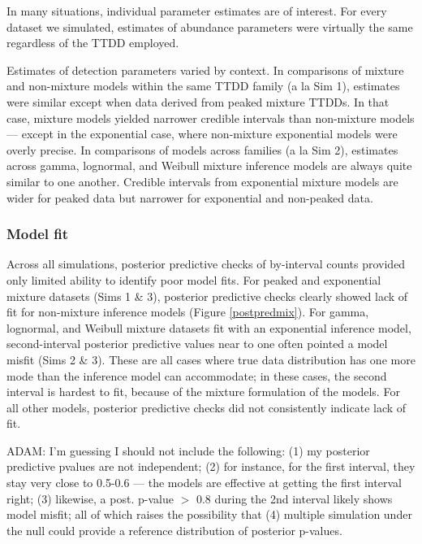 \documentclass[useAMS,usenatbib,referee,12pt]{article}
\newcommand{\adam}[1]{{\color{blue} ADAM: #1}}
\begin{document}
In many situations, individual parameter estimates are of interest.  For every dataset we simulated, estimates of abundance parameters were virtually the same regardless of the TTDD employed.

Estimates of detection parameters varied by context.  In comparisons of mixture and non-mixture models within the same TTDD family (a la Sim 1), estimates were similar except when data derived from peaked mixture TTDDs.  In that case, mixture models yielded narrower credible intervals than non-mixture models --- except in the exponential case, where non-mixture exponential models were overly precise.  In comparisons of models across families (a la Sim 2), estimates across gamma, lognormal, and Weibull mixture inference models are always quite similar to one another.  Credible intervals from exponential mixture models are wider for peaked data but narrower for exponential and non-peaked data.  


\subsubsection{Model fit}\label{sec:modelfit}

Across all simulations, posterior predictive checks of by-interval counts provided only limited ability to identify poor model fits.  For peaked and exponential mixture datasets (Sims 1 \& 3), posterior predictive checks clearly showed lack of fit for non-mixture inference models (Figure \ref{postpredmix}).  For gamma, lognormal, and Weibull mixture datasets fit with an exponential inference model, second-interval posterior predictive values near to one often pointed a model misfit (Sims 2 \& 3).  These are all cases where true data distribution has one more mode than the inference model can accommodate; in these cases, the second interval is hardest to fit, because of the mixture formulation of the models.  For all other models, posterior predictive checks did not consistently indicate lack of fit.

\adam{I'm guessing I should not include the following: (1) my posterior predictive pvalues are not independent; (2) for instance, for the first interval, they stay very close to 0.5-0.6 --- the models are effective at getting the first interval right; (3) likewise, a post. p-value $>$ 0.8 during the 2nd interval likely shows model misfit; all of which raises the possibility that (4) multiple simulation under the null could provide a reference distribution of posterior p-values.}
\end{document}
